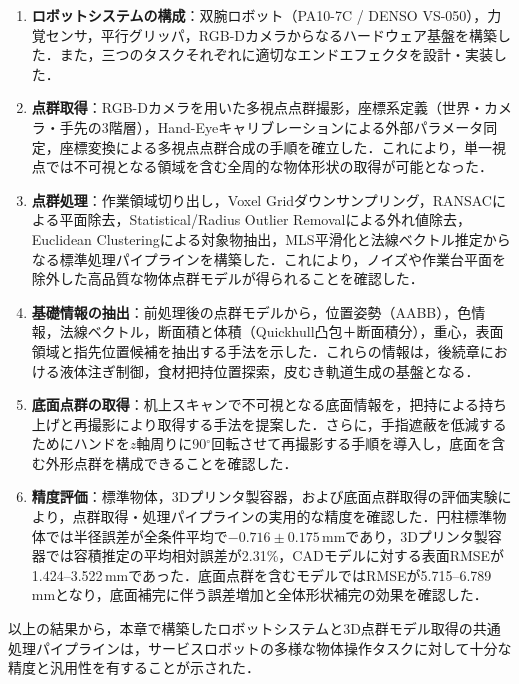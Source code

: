 \begin{enumerate}
  \item \textbf{ロボットシステムの構成}：双腕ロボット（PA10-7C / DENSO VS-050），力覚センサ，平行グリッパ，RGB-Dカメラからなるハードウェア基盤を構築した．また，三つのタスクそれぞれに適切なエンドエフェクタを設計・実装した．

  \item \textbf{点群取得}：RGB-Dカメラを用いた多視点点群撮影，座標系定義（世界・カメラ・手先の3階層），Hand-Eyeキャリブレーションによる外部パラメータ同定，座標変換による多視点点群合成の手順を確立した．これにより，単一視点では不可視となる領域を含む全周的な物体形状の取得が可能となった．

  \item \textbf{点群処理}：作業領域切り出し，Voxel Gridダウンサンプリング，RANSACによる平面除去，Statistical/Radius Outlier Removalによる外れ値除去，Euclidean Clusteringによる対象物抽出，MLS平滑化と法線ベクトル推定からなる標準処理パイプラインを構築した．これにより，ノイズや作業台平面を除外した高品質な物体点群モデルが得られることを確認した．

  \item \textbf{基礎情報の抽出}：前処理後の点群モデルから，位置姿勢（AABB），色情報，法線ベクトル，断面積と体積（Quickhull凸包＋断面積分），重心，表面領域と指先位置候補を抽出する手法を示した．これらの情報は，後続章における液体注ぎ制御，食材把持位置探索，皮むき軌道生成の基盤となる．

  \item \textbf{底面点群の取得}：机上スキャンで不可視となる底面情報を，把持による持ち上げと再撮影により取得する手法を提案した．さらに，手指遮蔽を低減するためにハンドを$z$軸周りに90$^{\circ}$回転させて再撮影する手順を導入し，底面を含む外形点群を構成できることを確認した．

  \item \textbf{精度評価}：標準物体，3Dプリンタ製容器，および底面点群取得の評価実験により，点群取得・処理パイプラインの実用的な精度を確認した．円柱標準物体では半径誤差が全条件平均で$-0.716\pm0.175$\,mmであり，3Dプリンタ製容器では容積推定の平均相対誤差が2.31\%，CADモデルに対する表面RMSEが1.424--3.522\,mmであった．底面点群を含むモデルではRMSEが5.715--6.789\,mmとなり，底面補完に伴う誤差増加と全体形状補完の効果を確認した．
\end{enumerate}

以上の結果から，本章で構築したロボットシステムと3D点群モデル取得の共通処理パイプラインは，サービスロボットの多様な物体操作タスクに対して十分な精度と汎用性を有することが示された．
